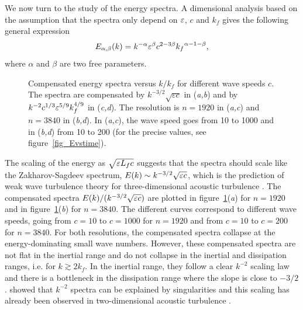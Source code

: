 We now turn to the study of the energy spectra.  A dimensional
analysis based on the assumption that the spectra only depend on
$\varepsilon$, $c$ and $k_f$ gives the following general expression
\begin{equation}
E_{\alpha, \beta}(k) = k^{-\alpha} \varepsilon^\beta   c^{2- 3\beta} 
{k_f}^{\alpha -1 - \beta}, \label{eq_E_alpha_beta}
\end{equation}
where $\alpha$ and $\beta$ are two free parameters.



\begin{figure}
\caption{
Compensated energy spectra versus $k/k_f$ for different wave speeds $c$.
%
The spectra are compensated by $k^{-3/2}\sqrt{\varepsilon c} $ 
in (\textit{a,b})
and by $k^{-2}c^{1/3} \varepsilon^{5/9} k_f^{4/9} $ 
in (\textit{c,d}).
%
The resolution is 
$n = 1920$ in (\textit{a,c}) and 
$n = 3840$ in (\textit{b,d}).
%
In (\textit{a,c}), the wave speed goes from 10 to 1000
and 
in (\textit{b,d}) from 10 to 200 
(for the precise values, see figure~\ref{fig_Evstime}).
}
\label{fig_spectra_c}
\end{figure}


The scaling of the energy as $\sqrt{\varepsilon L_f c}$ suggests that the
spectra should scale like the Zakharov-Sagdeev spectrum, $E(k) \sim
k^{-3/2}\sqrt{\varepsilon c}$, which is the prediction of weak wave
turbulence theory for three-dimensional acoustic turbulence
\cite[]{Nazarenko2011}.
%
The compensated spectra $E(k) / ( k^{-3/2}\sqrt{\varepsilon c})$ are plotted
in figure~\ref{fig_spectra_c}(\textit{a}) for $n = 1920$ and in
figure~\ref{fig_spectra_c}(\textit{b}) for $n = 3840$.  The different
curves correspond to different wave speeds, going from $c=10$ to
$c=1000$ for $n = 1920$ and from $c=10$ to $c=200$ for $n = 3840$.
%
For both resolutions, the compensated spectra collapse at the
energy-dominating small wave numbers.
%
However, these compensated spectra are not flat in the inertial range
and do not collapse in the inertial and dissipation ranges, i.e. for
$k\gtrsim 2k_f$.  In the inertial range, they follow a clear $k^{-2}$
scaling law and there is a bottleneck in the dissipation range where
the slope is close to $-3/2$.
%
\cite{Kuznetsov2004} showed that $k^{-2}$ spectra can be explained by
singularities and this scaling has already been observed in
two-dimensional acoustic turbulence \cite[]{FalkovichMeyer1996}.
%

